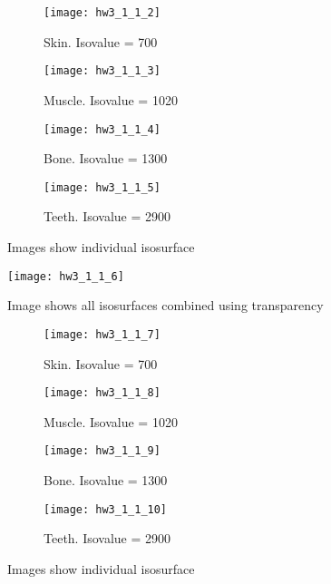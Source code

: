 \documentclass[11pt]{article}
\begin{document}
\begin{figure}[H]
\begin{subfigure}{.5\textwidth}
  \centering
  \texttt{[image: hw3\_1\_1\_2]}
  \caption{Skin. Isovalue = 700}
  \label{fig:hw3_1_1_2}
\end{subfigure}
\begin{subfigure}{.5\textwidth}
  \centering
  \texttt{[image: hw3\_1\_1\_3]}
  \caption{Muscle. Isovalue = 1020}
  \label{fig:hw3_1_1_3}
\end{subfigure}

\begin{subfigure}{.5\textwidth}
  \centering
  \texttt{[image: hw3\_1\_1\_4]}
  \caption{Bone. Isovalue = 1300}
  \label{fig:hw3_1_1_4}
\end{subfigure}
\begin{subfigure}{.5\textwidth}
  \centering
  \texttt{[image: hw3\_1\_1\_5]}
  \caption{Teeth. Isovalue = 2900}
  \label{fig:hw3_1_1_5}
\end{subfigure}
\caption{Images show individual isosurface}
\label{}
\end{figure}

\begin{figure}[H]
\centering
\texttt{[image: hw3\_1\_1\_6]}
\caption{Image shows all isosurfaces combined using transparency}
\label{fig:hw3_1_1_6}
\end{figure}

\begin{figure}[H]
\begin{subfigure}{.5\textwidth}
  \centering
  \texttt{[image: hw3\_1\_1\_7]}
  \caption{Skin. Isovalue = 700}
  \label{fig:hw3_1_1_7}
\end{subfigure}
\begin{subfigure}{.5\textwidth}
  \centering
  \texttt{[image: hw3\_1\_1\_8]}
  \caption{Muscle. Isovalue = 1020}
  \label{fig:hw3_1_1_8}
\end{subfigure}

\begin{subfigure}{.5\textwidth}
  \centering
  \texttt{[image: hw3\_1\_1\_9]}
  \caption{Bone. Isovalue = 1300}
  \label{fig:hw3_1_1_9}
\end{subfigure}
\begin{subfigure}{.5\textwidth}
  \centering
  \texttt{[image: hw3\_1\_1\_10]}
  \caption{Teeth. Isovalue = 2900}
  \label{fig:hw3_1_1_10}
\end{subfigure}
\caption{Images show individual isosurface}
\label{}
\end{figure}
\end{document}
